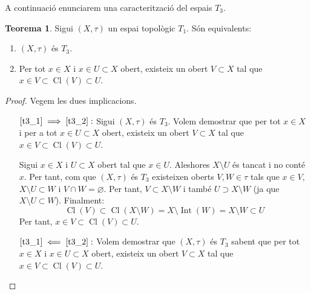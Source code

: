 \documentclass[10pt,a4paper]{article}
\theoremstyle{definition}
\newtheorem{theorem}{Teorema}[section]
\DeclareMathOperator{\Cl}{Cl} %
\DeclareMathOperator{\Int}{Int} %
\begin{document}
A continuació enunciarem una caracterització del espais $T_3$.
\begin{theorem}
      Sigui $(X,\tau)$ un espai topològic $T_1$. Són equivalents:
      \begin{enumerate}
            \item\label{t3_1} $(X,\tau)$ és $T_3$.
            \item\label{t3_2} Per tot $x\in X$ i $x\in U \subset X$ obert, existeix un obert $V\subset X$ tal que $x \in V\subset \Cl(V) \subset U$.
      \end{enumerate}
\end{theorem}
\begin{proof}
      Vegem les dues implicacions.
      \begin{itemize}[leftmargin=2cm]
            \item [$\ref{t3_1}\implies \ref{t3_2}:$] Sigui $(X,\tau)$ és $T_3$. Volem demostrar que per tot $x\in X$ i per a tot $x\in U \subset X$ obert, existeix un obert $V\subset X$ tal que $x \in V\subset \Cl(V) \subset U$.

                  Sigui $x\in X$ i $U\subset X$ obert tal que $x\in U$. Aleshores $X\setminus U$ és tancat i no conté $x$. Per tant, com que $(X,\tau)$ és $T_3$ existeixen oberts $V,W\in\tau$ tals que $x\in V$, $X\setminus U\subset W$ i $V\cap W=\varnothing$. Per tant, $V\subset X\setminus W$ i també $U\supset X\setminus W$ (ja que $X\setminus U\subset W$). Finalment: $$\Cl(V)\subset \Cl(X\setminus W)=X\setminus \Int(W)=X\setminus W\subset U$$
                  Per tant, $x\in V\subset \Cl(V)\subset U$.
            \item [$\ref{t3_1}\impliedby \ref{t3_2}:$] Volem demostrar que $(X,\tau)$ és $T_3$ sabent que per tot $x\in X$ i $x\in U \subset X$ obert, existeix un obert $V\subset X$ tal que $x \in V\subset \Cl(V) \subset U$.


\end{itemize}
\end{proof}
\end{document}
